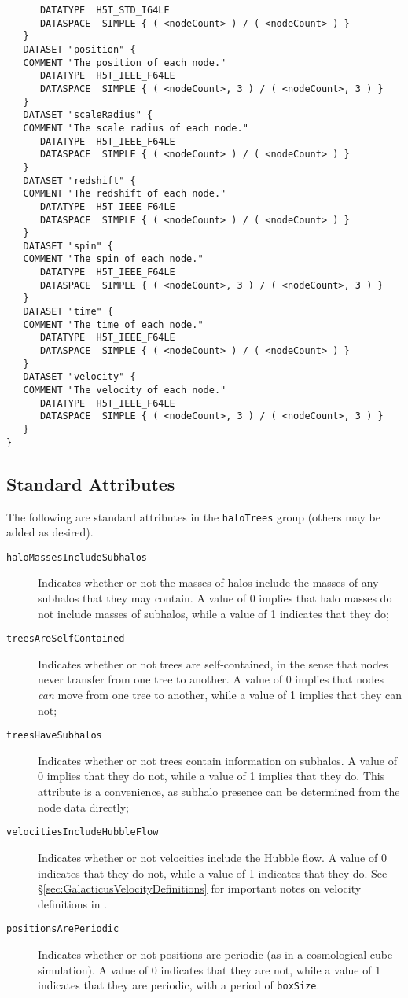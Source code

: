 \begin{verbatim}
      DATATYPE  H5T_STD_I64LE
      DATASPACE  SIMPLE { ( <nodeCount> ) / ( <nodeCount> ) }
   }
   DATASET "position" {
   COMMENT "The position of each node."
      DATATYPE  H5T_IEEE_F64LE
      DATASPACE  SIMPLE { ( <nodeCount>, 3 ) / ( <nodeCount>, 3 ) }
   }
   DATASET "scaleRadius" {
   COMMENT "The scale radius of each node."
      DATATYPE  H5T_IEEE_F64LE
      DATASPACE  SIMPLE { ( <nodeCount> ) / ( <nodeCount> ) }
   }
   DATASET "redshift" {
   COMMENT "The redshift of each node."
      DATATYPE  H5T_IEEE_F64LE
      DATASPACE  SIMPLE { ( <nodeCount> ) / ( <nodeCount> ) }
   }
   DATASET "spin" {
   COMMENT "The spin of each node."
      DATATYPE  H5T_IEEE_F64LE
      DATASPACE  SIMPLE { ( <nodeCount>, 3 ) / ( <nodeCount>, 3 ) }
   }
   DATASET "time" {
   COMMENT "The time of each node."
      DATATYPE  H5T_IEEE_F64LE
      DATASPACE  SIMPLE { ( <nodeCount> ) / ( <nodeCount> ) }
   }
   DATASET "velocity" {
   COMMENT "The velocity of each node."
      DATATYPE  H5T_IEEE_F64LE
      DATASPACE  SIMPLE { ( <nodeCount>, 3 ) / ( <nodeCount>, 3 ) }
   }
}
\end{verbatim}

\subsection{Standard Attributes}

The following are standard attributes in the {\tt haloTrees} group (others may be added as desired).

\begin{description}
 \item [{\tt haloMassesIncludeSubhalos}] Indicates whether or not the masses of halos include the masses of any subhalos that they may contain. A value of 0 implies that halo masses do not include masses of subhalos, while a value of 1 indicates that they do;
 \item [{\tt treesAreSelfContained}] Indicates whether or not trees are self-contained, in the sense that nodes never transfer from one tree to another. A value of 0 implies that nodes \emph{can} move from one tree to another, while a value of 1 implies that they can not;
 \item [{\tt treesHaveSubhalos}] Indicates whether or not trees contain information on subhalos. A value of 0 implies that they do not, while a value of 1 implies that they do. This attribute is a convenience, as subhalo presence can be determined from the node data directly;
 \item [{\tt velocitiesIncludeHubbleFlow}] Indicates whether or not velocities include the Hubble flow. A value of 0 indicates that they do not, while a value of 1 indicates that they do. See \S\ref{sec:GalacticusVelocityDefinitions} for important notes on velocity definitions in \glc.
 \item [{\tt positionsArePeriodic}] Indicates whether or not positions are periodic (as in a cosmological cube simulation). A value of 0 indicates that they are not, while a value of 1 indicates that they are periodic, with a period of {\tt boxSize}.
\end{description}

